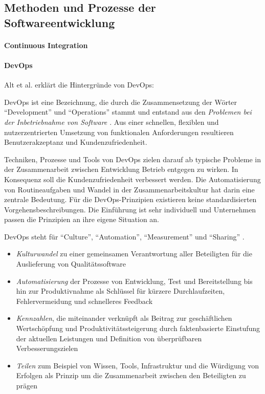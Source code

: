 \cite{Gupta:2017}


\subsection{Methoden und Prozesse der Softwareentwicklung}

\paragraph{Continuous Integration}

\paragraph{DevOps}
Alt et al. erklärt die Hintergründe von DevOps:

DevOps ist eine Bezeichnung, die durch die Zusammensetzung der Wörter \enquote{Development} und \enquote{Operations} stammt und entstand aus den \emph{Problemen bei der Inbetriebnahme von Software \cite{mci/Disterer2011}}.
Aus einer schnellen, flexiblen und nutzerzentrierten Umsetzung von funktionalen Anforderungen resultieren Benutzerakzeptanz und Kundenzufriedenheit. 

Techniken, Prozesse und Tools von DevOps zielen darauf ab typische Probleme in der Zusammenarbeit zwischen Entwicklung Betrieb entgegen zu wirken. In Konsequenz soll die Kundenzufriedenheit verbessert werden. Die Automatisierung von Routineaufgaben und Wandel in der Zusammenarbeitskultur hat darin eine zentrale Bedeutung. Für die DevOps-Prinzipien existieren keine standardisierten Vorgehensbeschreibungen. Die Einführung ist sehr individuell und Unternehmen passen die Prinzipien an ihre eigene Situation an. 

DevOps steht für \enquote{Culture}, \enquote{Automation}, \enquote{Measurement} und \enquote{Sharing} \cite{humble:2011}. 
\begin{itemize}
    \item \emph{Kulturwandel} zu einer gemeinsamen Verantwortung aller Beteiligten für die Auslieferung von Qualitätssoftware
    \item \emph{Automatisierung} der Prozesse von Entwicklung, Test und Bereitstellung bis hin zur Produktivnahme als Schlüssel für kürzere Durchlaufzeiten, Fehlervermeidung und schnelleres Feedback
    \item \emph{Kennzahlen}, die miteinander verknüpft als Beitrag zur geschäftlichen Wertschöpfung und Produktivitätssteigerung durch faktenbasierte Einstufung der aktuellen Leistungen und Definition von überprüfbaren Verbesserungszielen
    \item \emph{Teilen} zum Beispiel von Wissen, Tools, Infrastruktur und die Würdigung von Erfolgen als Prinzip um die Zusammenarbeit zwischen den Beteiligten zu prägen
\end{itemize}

